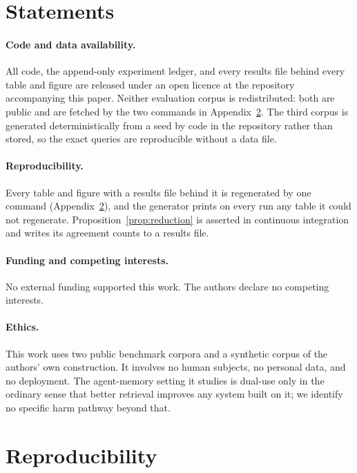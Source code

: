 \section{Statements}
\label{app:statements}

\paragraph{Code and data availability.} All code, the append-only experiment ledger, and
every results file behind every table and figure are released under an open licence at the
repository accompanying this paper. Neither evaluation corpus is redistributed: both are
public and are fetched by the two commands in Appendix~\ref{app:repro}. The third corpus is
generated deterministically from a seed by code in the repository rather than stored, so
the exact queries are reproducible without a data file.

\paragraph{Reproducibility.} Every table and figure with a results file behind it is
regenerated by one command (Appendix~\ref{app:repro}), and the generator prints on every
run any table it could not regenerate. Proposition~\ref{prop:reduction} is asserted in
continuous integration and writes its agreement counts to a results file.

\paragraph{Funding and competing interests.} No external funding supported this work. The
authors declare no competing interests.

\paragraph{Ethics.} This work uses two public benchmark corpora and a synthetic corpus of
the authors' own construction. It involves no human subjects, no personal data, and no
deployment. The agent-memory setting it studies is dual-use only in the ordinary sense that
better retrieval improves any system built on it; we identify no specific harm pathway
beyond that.

\section{Reproducibility}
\label{app:repro}

